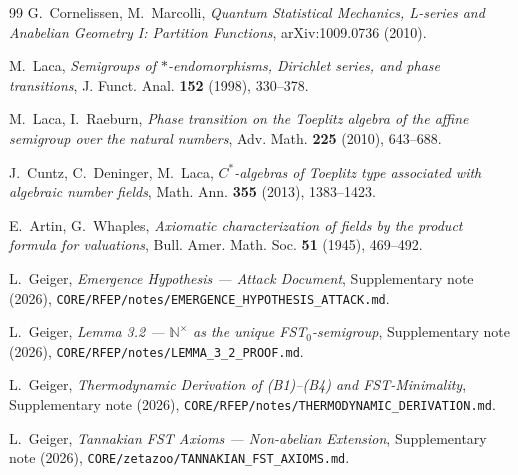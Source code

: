 \documentclass[11pt,a4paper]{article}
\theoremstyle{plain}
\theoremstyle{definition}
\newcommand{\N}{\mathbb{N}}
\begin{document}
\begin{thebibliography}{99}
G.~Cornelissen, M.~Marcolli,
\textit{Quantum Statistical Mechanics, L-series and Anabelian
Geometry I: Partition Functions},
arXiv:1009.0736 (2010).

M.~Laca,
\textit{Semigroups of $\ast$-endomorphisms, Dirichlet series, and
phase transitions},
J. Funct. Anal. \textbf{152} (1998), 330--378.

M.~Laca, I.~Raeburn,
\textit{Phase transition on the Toeplitz algebra of the affine
semigroup over the natural numbers},
Adv. Math. \textbf{225} (2010), 643--688.

J.~Cuntz, C.~Deninger, M.~Laca,
\textit{$C^\ast$-algebras of Toeplitz type associated with
algebraic number fields},
Math. Ann. \textbf{355} (2013), 1383--1423.

E.~Artin, G.~Whaples,
\textit{Axiomatic characterization of fields by the product formula
for valuations},
Bull. Amer. Math. Soc. \textbf{51} (1945), 469--492.

L.~Geiger,
\textit{Emergence Hypothesis --- Attack Document},
Supplementary note (2026),
\texttt{CORE/RFEP/notes/EMERGENCE\_HYPOTHESIS\_ATTACK.md}.

L.~Geiger,
\textit{Lemma 3.2 --- $\N^\times$ as the unique FST$_0$-semigroup},
Supplementary note (2026),
\texttt{CORE/RFEP/notes/LEMMA\_3\_2\_PROOF.md}.

L.~Geiger,
\textit{Thermodynamic Derivation of (B1)--(B4) and FST-Minimality},
Supplementary note (2026),
\texttt{CORE/RFEP/notes/THERMODYNAMIC\_DERIVATION.md}.

L.~Geiger,
\textit{Tannakian FST Axioms --- Non-abelian Extension},
Supplementary note (2026),
\texttt{CORE/zetazoo/TANNAKIAN\_FST\_AXIOMS.md}.

\end{thebibliography}
\end{document}
